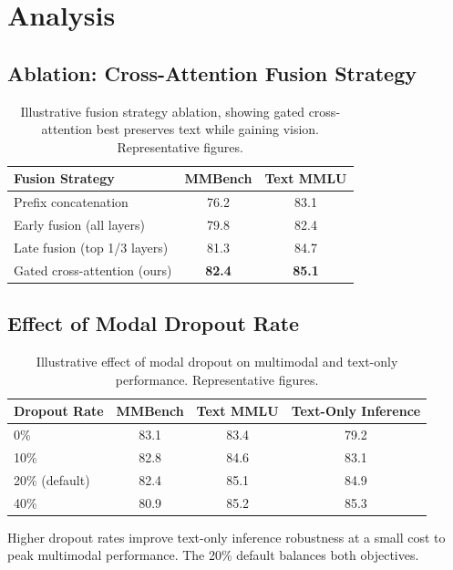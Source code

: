 \documentclass[11pt,a4paper]{article}
\begin{document}
\section{Analysis}

\subsection{Ablation: Cross-Attention Fusion Strategy}

\begin{table}[H]
\centering
\begin{tabular}{lcc}
\toprule
\textbf{Fusion Strategy} & \textbf{MMBench} & \textbf{Text MMLU} \\
\midrule
Prefix concatenation & 76.2 & 83.1 \\
Early fusion (all layers) & 79.8 & 82.4 \\
Late fusion (top 1/3 layers) & 81.3 & 84.7 \\
Gated cross-attention (ours) & \textbf{82.4} & \textbf{85.1} \\
\bottomrule
\end{tabular}
\caption{Illustrative fusion strategy ablation, showing gated cross-attention best preserves text while gaining vision. Representative figures.}
\end{table}

\subsection{Effect of Modal Dropout Rate}

\begin{table}[H]
\centering
\begin{tabular}{lccc}
\toprule
\textbf{Dropout Rate} & \textbf{MMBench} & \textbf{Text MMLU} & \textbf{Text-Only Inference} \\
\midrule
0\% & 83.1 & 83.4 & 79.2 \\
10\% & 82.8 & 84.6 & 83.1 \\
20\% (default) & 82.4 & 85.1 & 84.9 \\
40\% & 80.9 & 85.2 & 85.3 \\
\bottomrule
\end{tabular}
\caption{Illustrative effect of modal dropout on multimodal and text-only performance. Representative figures.}
\end{table}

Higher dropout rates improve text-only inference robustness at a small cost to
peak multimodal performance. The 20\% default balances both objectives.
\end{document}
